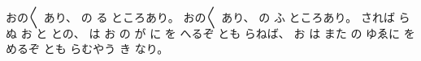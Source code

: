 
%
おの〳〵
あり、
%
の
る
ところあり。
%
おの〳〵
あり、%
%
の%
ふ
ところあり。
%
されば
らぬ
お
と
との、
%
は
お
の
が
に
を
へるぞ
とも
らねば、
%
お
は
また
の
ゆゑに
を
めるぞ
とも
らむやう
き
なり。


